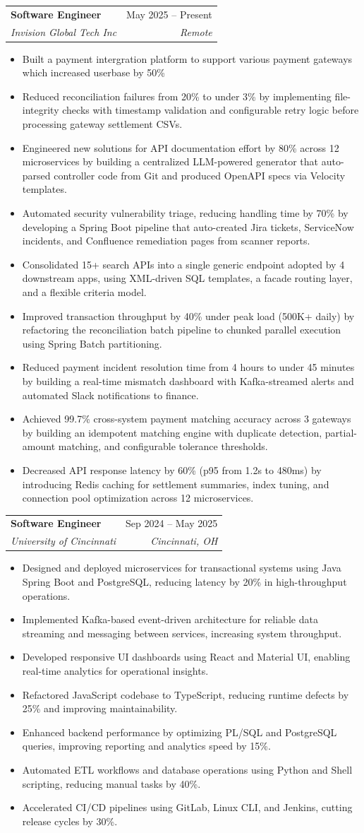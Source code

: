 \documentclass[letterpaper,11pt]{article}
\makeatletter
\newcommand{\resumeItem}[1]{
  \item\small{
    {#1 \vspace{-2pt}}
  }
}
\newcommand{\resumeSubheading}[4]{
  \vspace{-2pt}\item
    \begin{tabular*}{0.97\textwidth}[t]{l@{\extracolsep{\fill}}r}
      \textbf{#1} & #2 \\
      \textit{\small#3} & \textit{\small #4} \\
    \end{tabular*}\vspace{-7pt}
}
\newcommand{\resumeItemListStart}{\begin{itemize}}
\newcommand{\resumeItemListEnd}{\end{itemize}\vspace{-5pt}}
\makeatother
\begin{document}
    \resumeSubheading
      {Software Engineer}{May 2025 -- Present}
      {Invision Global Tech Inc}{Remote}
      \resumeItemListStart
        \resumeItem{Built a payment intergration platform to support various payment gateways which increased userbase by 50\%} 
        \resumeItem{Reduced reconciliation failures from 20\% to under 3\% by implementing file-integrity checks with timestamp validation and configurable retry logic before processing gateway settlement CSVs.}
        \resumeItem{Engineered new solutions for API documentation effort by 80\% across 12 microservices by building a centralized LLM-powered generator that auto-parsed controller code from Git and produced OpenAPI specs via Velocity templates.}
        \resumeItem{Automated security vulnerability triage, reducing handling time by 70\% by developing a Spring Boot pipeline that auto-created Jira tickets, ServiceNow incidents, and Confluence remediation pages from scanner reports.}
        \resumeItem{Consolidated 15+ search APIs into a single generic endpoint adopted by 4 downstream apps, using XML-driven SQL templates, a facade routing layer, and a flexible criteria model.}
        \resumeItem{Improved transaction throughput by 40\% under peak load (500K+ daily) by refactoring the reconciliation batch pipeline to chunked parallel execution using Spring Batch partitioning.}
        \resumeItem{Reduced payment incident resolution time from 4 hours to under 45 minutes by building a real-time mismatch dashboard with Kafka-streamed alerts and automated Slack notifications to finance.}
        \resumeItem{Achieved 99.7\% cross-system payment matching accuracy across 3 gateways by building an idempotent matching engine with duplicate detection, partial-amount matching, and configurable tolerance thresholds.}
        \resumeItem{Decreased API response latency by 60\% (p95 from 1.2s to 480ms) by introducing Redis caching for settlement summaries, index tuning, and connection pool optimization across 12 microservices.}
      \resumeItemListEnd

    \resumeSubheading
      {Software Engineer}{Sep 2024 -- May 2025}
      {University of Cincinnati}{Cincinnati, OH}
      \resumeItemListStart
        \resumeItem{Designed and deployed microservices for transactional systems using Java Spring Boot and PostgreSQL, reducing latency by 20\% in high-throughput operations.}
        \resumeItem{Implemented Kafka-based event-driven architecture for reliable data streaming and messaging between services, increasing system throughput.}
        \resumeItem{Developed responsive UI dashboards using React and Material UI, enabling real-time analytics for operational insights.}
        \resumeItem{Refactored JavaScript codebase to TypeScript, reducing runtime defects by 25\% and improving maintainability.}
        \resumeItem{Enhanced backend performance by optimizing PL/SQL and PostgreSQL queries, improving reporting and analytics speed by 15\%.}
        \resumeItem{Automated ETL workflows and database operations using Python and Shell scripting, reducing manual tasks by 40\%.}
        \resumeItem{Accelerated CI/CD pipelines using GitLab, Linux CLI, and Jenkins, cutting release cycles by 30\%.}
      \resumeItemListEnd
\end{document}
